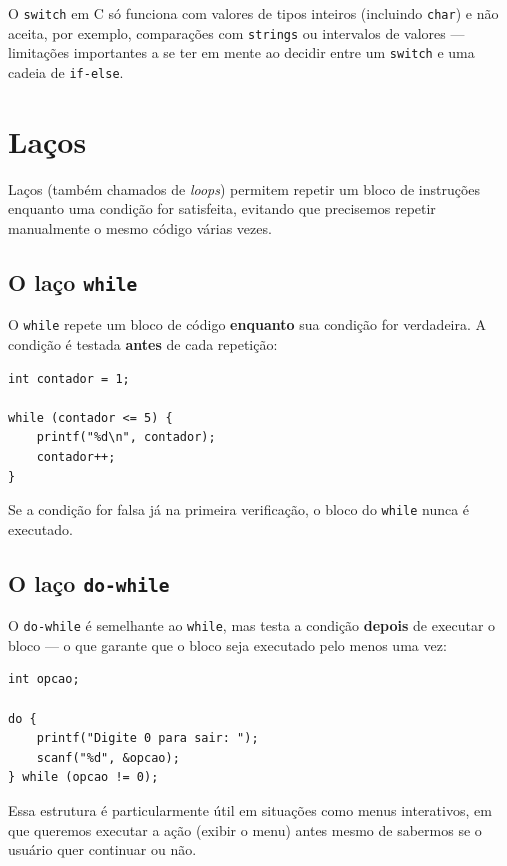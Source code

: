 \documentclass[12pt,a4paper,oneside]{extreport}
\begin{document}
O \texttt{switch} em C só funciona com valores de tipos inteiros (incluindo \texttt{char}) e não aceita, por exemplo, comparações com \texttt{strings} ou intervalos de valores — limitações importantes a se ter em mente ao decidir entre um \texttt{switch} e uma cadeia de \texttt{if-else}.

\section{Laços}

Laços (também chamados de \textit{loops}) permitem repetir um bloco de instruções enquanto uma condição for satisfeita, evitando que precisemos repetir manualmente o mesmo código várias vezes.

\subsection{O laço \texttt{while}}

O \texttt{while} repete um bloco de código \textbf{enquanto} sua condição for verdadeira. A condição é testada \textbf{antes} de cada repetição:

\begin{lstlisting}
int contador = 1;

while (contador <= 5) {
    printf("%d\n", contador);
    contador++;
}
\end{lstlisting}

Se a condição for falsa já na primeira verificação, o bloco do \texttt{while} nunca é executado.

\subsection{O laço \texttt{do-while}}

O \texttt{do-while} é semelhante ao \texttt{while}, mas testa a condição \textbf{depois} de executar o bloco — o que garante que o bloco seja executado pelo menos uma vez:

\begin{lstlisting}
int opcao;

do {
    printf("Digite 0 para sair: ");
    scanf("%d", &opcao);
} while (opcao != 0);
\end{lstlisting}

Essa estrutura é particularmente útil em situações como menus interativos, em que queremos executar a ação (exibir o menu) antes mesmo de sabermos se o usuário quer continuar ou não.
\end{document}
